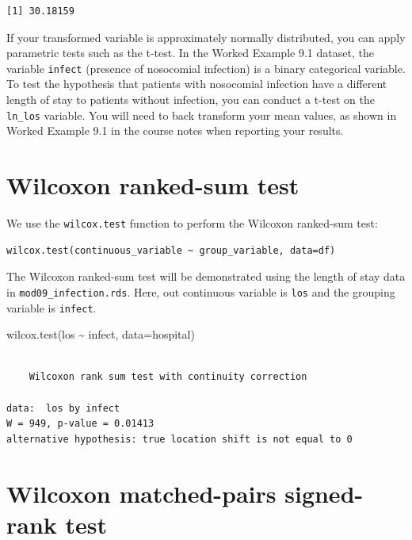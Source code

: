 \documentclass[
  a4paper,
]{memoir}
\newenvironment{Shaded}{\begin{snugshade}}{\end{snugshade}}
\newcommand{\AttributeTok}[1]{\textcolor[rgb]{0.00,0.00,0.00}{#1}}
\newcommand{\FunctionTok}[1]{\textcolor[rgb]{0.00,0.00,0.00}{#1}}
\newcommand{\NormalTok}[1]{\textcolor[rgb]{0.00,0.00,0.00}{#1}}
\newcommand{\SpecialCharTok}[1]{\textcolor[rgb]{0.00,0.00,0.00}{#1}}
\begin{document}
\begin{verbatim}
[1] 30.18159
\end{verbatim}

If your transformed variable is approximately normally distributed, you
can apply parametric tests such as the t-test. In the Worked Example 9.1
dataset, the variable \texttt{infect} (presence of nosocomial infection)
is a binary categorical variable. To test the hypothesis that patients
with nosocomial infection have a different length of stay to patients
without infection, you can conduct a t-test on the \texttt{ln\_los}
variable. You will need to back transform your mean values, as shown in
Worked Example 9.1 in the course notes when reporting your results.

\section{Wilcoxon ranked-sum test}\label{wilcoxon-ranked-sum-test-1}

We use the \texttt{wilcox.test} function to perform the Wilcoxon
ranked-sum test:

\begin{verbatim}
wilcox.test(continuous_variable ~ group_variable, data=df)
\end{verbatim}

The Wilcoxon ranked-sum test will be demonstrated using the length of
stay data in \texttt{mod09\_infection.rds}. Here, out continuous
variable is \texttt{los} and the grouping variable is \texttt{infect}.

\begin{Shaded}
\begin{Highlighting}[]
\FunctionTok{wilcox.test}\NormalTok{(los }\SpecialCharTok{\textasciitilde{}}\NormalTok{ infect, }\AttributeTok{data=}\NormalTok{hospital)}
\end{Highlighting}
\end{Shaded}

\begin{verbatim}

    Wilcoxon rank sum test with continuity correction

data:  los by infect
W = 949, p-value = 0.01413
alternative hypothesis: true location shift is not equal to 0
\end{verbatim}

\section{Wilcoxon matched-pairs signed-rank
test}\label{wilcoxon-matched-pairs-signed-rank-test-1}
\end{document}
